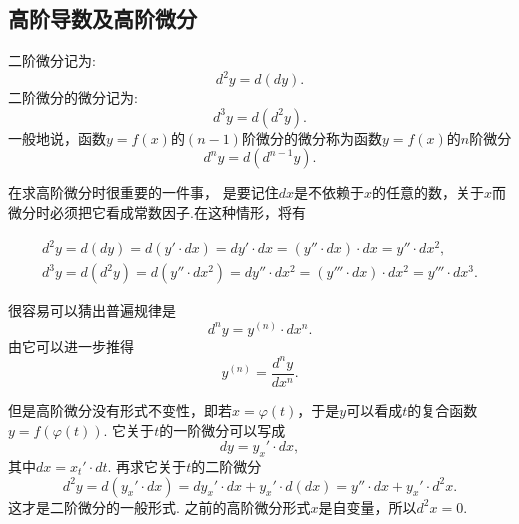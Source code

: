 \documentclass{article}
\begin{document}
\newpage
\subsection{高阶导数及高阶微分}

二阶微分记为:\[d^2 y =d(dy).\]二阶微分的微分记为:\[d^3 y = d(d^2 y).\]一般地说，函数$y=f(x)$的$(n-1)$阶微分的微分称为函数$y=f(x)$的$n$阶微分\[d^n y  = d(d^{n-1} y).\]

在求高阶微分时很重要的一件事，{\color{red} 是要记住$dx$是不依赖于$x$的任意的数，关于$x$而微分时必须把它看成常数因子}.在这种情形，将有

\begin{align*}
	d^2 y = d(dy) = d(y' \cdot dx) = dy' \cdot dx = (y'' \cdot dx) \cdot dx = y'' \cdot dx^2, \\
	d^3 y = d(d^2 y) = d(y'' \cdot dx^2) =dy'' \cdot dx^2 = (y'''\cdot dx)\cdot dx^2 = y''' \cdot dx^3.
\end{align*}

很容易可以猜出普遍规律是\[d^n y = y^{(n)} \cdot dx^n.\]由它可以进一步推得\[y^{(n)} = \frac{d^n y}{d x^n}.\]

{\color{blue} 但是高阶微分没有形式不变性}，即若$x = \varphi(t)$，于是$y$可以看成$t$的复合函数$y = f(\varphi(t))$. 它关于$t$的一阶微分可以写成\[dy =y_x' \cdot dx,\]其中$dx = x_t' \cdot dt$. 再求它关于$t$的二阶微分\[d^2 y = d(y_x' \cdot dx) = dy_x' \cdot dx + y_x' \cdot d(dx) = y'' \cdot dx + y_x' \cdot d^2 x.\]这才是二阶微分的一般形式. 之前的高阶微分形式$x$是自变量，所以$d^2 x = 0$.
\end{document}
